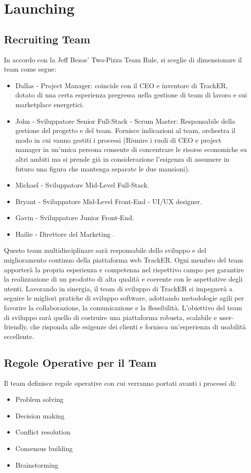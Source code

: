 \documentclass[oneside]{book}
\begin{document}
\chapter{Launching}
\section{Recruiting Team}
In accordo con la Jeff Bezos’ Two-Pizza Team Rule, si sceglie di dimensionare il team come segue:
\begin{itemize}
    \item Dallas - Project Manager: coincide con il CEO e inventore di TrackER, dotato di una certa esperienza pregressa nella gestione di team di lavoro e sui marketplace energetici.
    \item John - Sviluppatore Senior Full-Stack - Scrum Master: Responsabile della gestione del progetto e del team. Fornisce indicazioni al team, orchestra il modo in cui vanno gestiti i processi (Riunire i ruoli di CEO e project manager in un'unica persona consente di concentrare le risorse economiche su altri ambiti ma si prende già in considerazione l'esigenza di assumere in futuro una figura che mantenga separate le due mansioni).    
    \item Michael - Sviluppatore Mid-Level Full-Stack.
    \item Bryant - Sviluppatore Mid-Level Front-End - UI/UX designer.
    \item Gavin - Sviluppatore Junior Front-End.
    \item Hailie - Direttore del Marketing .
\end{itemize}
Questo team multidisciplinare sarà responsabile dello sviluppo e del miglioramento continuo della piattaforma web TrackER. 
\newline Ogni membro del team apporterà la propria esperienza e competenza nel rispettivo campo per garantire la realizzazione di un prodotto di alta qualità e coerente con le aspettative degli utenti.
\newline Lavorando in sinergia, il team di sviluppo di TrackER si impegnerà a seguire le migliori pratiche di sviluppo software, adottando metodologie agili per favorire la collaborazione, la comunicazione e la flessibilità. \newline L'obiettivo del team di sviluppo sarà quello di costruire una piattaforma robusta, scalabile e user-friendly, che risponda alle esigenze dei clienti e fornisca un'esperienza di usabilità eccellente.

\section{Regole Operative per il Team}
Il team definisce regole operative con cui verranno portati avanti i processi di:
\begin{itemize}
    \item Problem solving
    \item Decision making
    \item Conflict resolution
    \item Consensus building
    \item Brainstorming
\end{itemize}
\end{document}
